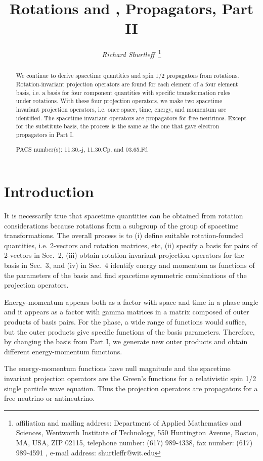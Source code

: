 \documentclass[a4paper,12pt]{article}
\title{ Rotations and \myHighlight{$e$}\coordHE{}, \myHighlight{$\nu$}\coordHE{} Propagators, Part II}
\author{{\it Richard Shurtleff~}\thanks{affiliation and mailing 
address: Department of Applied Mathematics and Sciences, 
Wentworth Institute of Technology, 550 Huntington Avenue, 
Boston, MA, USA, ZIP 02115, telephone number: (617) 989-4338, fax 
number: (617) 989-4591 , e-mail address: shurtleffr@wit.edu}}
\begin{document}
 
          
\maketitle               
			\begin{abstract}  

We continue to derive spacetime quantities and spin 1/2 propagators from rotations. Rotation-invariant projection operators are found for each element of a four element basis, i.e. a basis for four component quantities with specific transformation rules under rotations. With these four projection operators, we make two spacetime invariant projection operators, i.e. once space, time, energy, and momentum are identified. The spacetime invariant operators are propagators for free neutrinos. Except for the substitute basis, the process is the same as the one that gave electron propagators in Part I. 

PACS number(s): 11.30.-j, 11.30.Cp, and 03.65.Fd 
 
			\end{abstract}
\pagebreak

\section{Introduction} \label{intro} %

	It is necessarily true that spacetime quantities can be obtained from rotation considerations because rotations form a subgroup of the group of spacetime transformations. The overall process \cite{partI} is to (i) define suitable rotation-founded quantities, i.e. 2-vectors and rotation matrices, etc, (ii) specify a basis for pairs of 2-vectors in Sec.~2, (iii) obtain rotation invariant projection operators for the basis in Sec.~3, and (iv) in Sec.~4 identify energy and momentum as functions of the parameters of the basis and find spacetime symmetric combinations of the projection operators.

	Energy-momentum appears both as a factor with space and time in a phase angle and it appears as a factor with gamma matrices in a matrix composed of outer products of basis pairs. For the phase, a wide range of functions would suffice, but the outer products give specific functions of the basis parameters. Therefore, by changing the basis from Part I, we generate new outer products and obtain different energy-momentum functions. 

	The energy-momentum functions have null magnitude and the spacetime invariant projection operators are the Green's functions for a relativistic spin 1/2 single particle wave equation. Thus the projection operators are propagators for a free neutrino or antineutrino.
\end{document}
